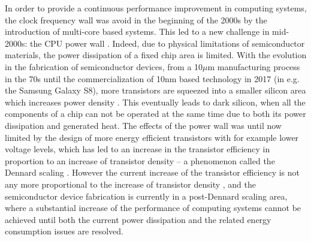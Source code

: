 \documentclass{article}
\begin{document}
In order to provide a continuous performance improvement in computing systems, the clock frequency wall was avoid in the beginning of the 2000s by the introduction of multi-core based systems. 
This led to a new challenge in mid-2000s: the CPU power wall \cite{Danowitz:12,Wang:13}. 
Indeed, due to physical limitations of semiconductor materials, the power dissipation of a fixed chip area is limited. 
With the evolution in the fabrication of semiconductor devices, from a 10$\mu$m manufacturing process in the 70s until the commercialization of 10nm based technology in 2017 (in e.g. the Samsung Galaxy S8), more transistors are squeezed into a smaller silicon area which increases power density \cite{5514312}. 
This eventually leads to dark silicon, when all the components of a chip can not be operated at the same time due to both its power dissipation and generated heat. 
The effects of the power wall was until now limited by the design of more energy efficient transistors with for example lower voltage levels,
which has led to an increase in the transistor efficiency in proportion to an increase of transistor density -- a phenomenon called the Dennard scaling \cite{Dennard:74}. 
However the current increase of the transistor efficiency is not any more proportional to the increase of transistor density \cite{Wang:13}, 
and the semiconductor device fabrication is currently in a post-Dennard scaling area, where a substantial increase of the performance of computing
systems cannot be achieved until both the current power dissipation and the related energy consumption issues are resolved.\smallskip
\end{document}
